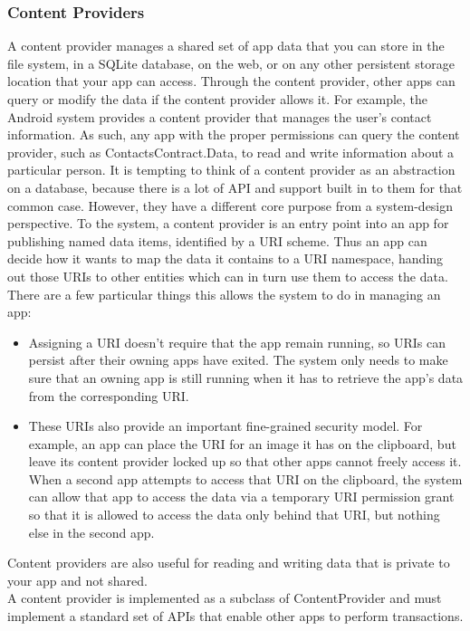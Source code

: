 \documentclass[14pt]{report}
\begin{document}
				\subsubsection{Content Providers}
					A content provider manages a shared set of app data that you can store in the file system, in a SQLite database, on the web, or on any other persistent storage location that your app can access. Through the content provider, other apps can query or modify the data if the content provider allows it. For example, the Android system provides a content provider that manages the user's contact information. As such, any app with the proper permissions can query the content provider, such as ContactsContract.Data, to read and write information about a particular person. It is tempting to think of a content provider as an abstraction on a database, because there is a lot of API and support built in to them for that common case. However, they have a different core purpose from a system-design perspective. To the system, a content provider is an entry point into an app for publishing named data items, identified by a URI scheme. Thus an app can decide how it wants to map the data it contains to a URI namespace, handing out those URIs to other entities which can in turn use them to access the data. There are a few particular things this allows the system to do in managing an app:
					\begin{itemize}
						\item Assigning a URI doesn't require that the app remain running, so URIs can persist after their owning apps have exited. The system only needs to make sure that an owning app is still running when it has to retrieve the app's data from the corresponding URI.
						\item These URIs also provide an important fine-grained security model. For example, an app can place the URI for an image it has on the clipboard, but leave its content provider locked up so that other apps cannot freely access it. When a second app attempts to access that URI on the clipboard, the system can allow that app to access the data via a temporary URI permission grant so that it is allowed to access the data only behind that URI, but nothing else in the second app.
					\end{itemize}

					Content providers are also useful for reading and writing data that is private to your app and not shared.\\

					A content provider is implemented as a subclass of ContentProvider and must implement a standard set of APIs that enable other apps to perform transactions.\newline \newline
\end{document}
